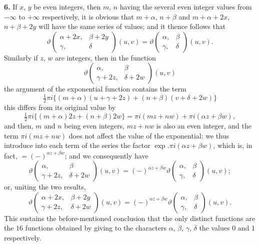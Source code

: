 \documentclass[11pt,a4paper]{book}
\begin{document}
\noindent\textbf{6.}\quad
If $x$, $y$ be even integers, then $m$, $n$ having the several even integer values from $-\infty$ to $+\infty$ respectively, it is obvious that $m + \alpha$, $n + \beta$ and $m + \alpha + 2x$, $n + \beta + 2y$ will have the same series of values; and it thence follows that
\[
\vartheta\begin{pmatrix} \alpha + 2x, & \beta + 2y \\ \gamma, & \delta \end{pmatrix}(u, v) = \vartheta\begin{pmatrix} \alpha, & \beta \\ \gamma, & \delta \end{pmatrix}(u, v).
\]
Similarly if $z$, $w$ are integers, then in the function
\[
\vartheta\begin{pmatrix} \alpha, & \beta \\ \gamma + 2z, & \delta + 2w \end{pmatrix}(u, v)
\]
the argument of the exponential function contains the term
\[
\tfrac{1}{2}\pi i\{(m + \alpha)(u + \gamma + 2z) + (n + \beta)(v + \delta + 2w)\}
\]
this differs from its original value by
\[
\tfrac{1}{2}\pi i\{(m + \alpha)2z + (n + \beta)2w\} = \pi i(mz + nw) + \pi i(\alpha z + \beta w),
\]
and then, $m$ and $n$ being even integers, $mz + nw$ is also an even integer, and the term $\pi i(mz + nw)$ does not affect the value of the exponential: we thus introduce into each term of the series the factor $\exp.\pi i(\alpha z + \beta w)$, which is, in fact, $= (-)^{\alpha z + \beta w}$; and we consequently have
\[
\vartheta\begin{pmatrix} \alpha, & \beta \\ \gamma + 2z, & \delta + 2w \end{pmatrix}(u, v) = (-)^{\alpha z + \beta w}\vartheta\begin{pmatrix} \alpha, & \beta \\ \gamma, & \delta \end{pmatrix}(u, v);
\]
or, uniting the two results,
\[
\vartheta\begin{pmatrix} \alpha + 2x, & \beta + 2y \\ \gamma + 2z, & \delta + 2w \end{pmatrix}(u, v) = (-)^{\alpha z + \beta w}\vartheta\begin{pmatrix} \alpha, & \beta \\ \gamma, & \delta \end{pmatrix}(u, v).
\]
This sustains the before-mentioned conclusion that the only distinct functions are the $16$ functions obtained by giving to the characters $\alpha$, $\beta$, $\gamma$, $\delta$ the values $0$ and $1$ respectively.
\end{document}
